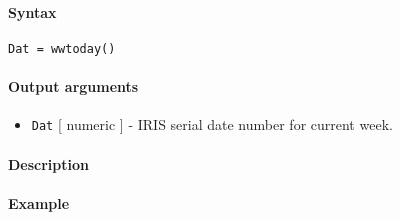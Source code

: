 


	\paragraph{Syntax}

\begin{verbatim}
Dat = wwtoday()
\end{verbatim}

\paragraph{Output arguments}

\begin{itemize}
\itemsep1pt\parskip0pt
\item
  \texttt{Dat} {[} numeric {]} - IRIS serial date number for current
  week.
\end{itemize}

\paragraph{Description}

\paragraph{Example}


